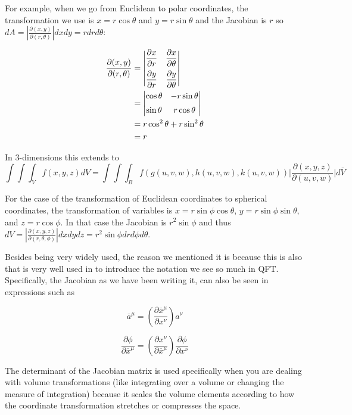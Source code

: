 For example, when we go from Euclidean to polar coordinates, the transformation we use is $x = r\cos\theta$
and $y = r\sin\theta$ and the Jacobian is $r$ so
$dA = \left| \frac{\partial (x, y)}{\partial (r, \theta)} \right| dx dy = r dr d\theta$:

\begin{align*}
\frac{\partial (x, y)}{\partial (r, \theta)} &= 
\begin{vmatrix}
    \dfrac{ \partial x }{ \partial r } & \dfrac{ \partial x }{ \partial \theta } \\ \addlinespace
    \dfrac{ \partial y }{ \partial r } & \dfrac{ \partial y }{ \partial \theta }
\end{vmatrix} \\
& = \begin{vmatrix}
    \cos\theta & -r\sin\theta \\ \addlinespace
    \sin\theta & r\cos\theta
\end{vmatrix} \\
&= r \cos^2 \theta + r \sin^2 \theta \\
&= r
\end{align*}



In 3-dimensions this extends to
$$
\int \int \int_{V} f(x,y,z) dV
= \int \int \int_{B} f\left( g(u,v,w), h(u,v,w), k(u,v,w) \right) \Biggl| \frac{ \partial (x,y,z) }{ \partial (u,v,w) } \Biggl| d\overline{V}
$$

For the case of the transformation of Euclidean coordinates to spherical coordinates, the transformation of variables is
$x = r \sin\phi \cos\theta $, $y = r \sin\phi \sin\theta$, and $z = r\cos\phi$.
In that case the Jacobian is $r^2 \sin\phi$ and thus
$dV = \left| \frac{\partial (x, y, z)}{\partial (r, \theta, \phi)} \right| dx dy dz = r^2 \sin\phi dr d\phi d\theta$.


Besides being very widely used, the reason we mentioned it is because this is also that is very well used in
\cite{gifted-qft} to introduce the notation we see so much in QFT.
Specifically, the Jacobian as we have been writing it, can also be seen in expressions such as

$$
\overline{a}^{\mu} = \left( \frac{\partial \overline{x}^\mu}{\partial x^\nu} \right) a^\nu
$$

$$
\frac{\partial \phi}{\partial \overline{x}^\mu} =
    \left( \frac{\partial x^\nu}{\partial \overline{x}^\mu} \right) \frac{\partial \phi}{\partial x^\nu}
$$

The determinant of the Jacobian matrix is used specifically when you are dealing with volume transformations
(like integrating over a volume or changing the measure of integration) because it scales the volume elements according
to how the coordinate transformation stretches or compresses the space.

